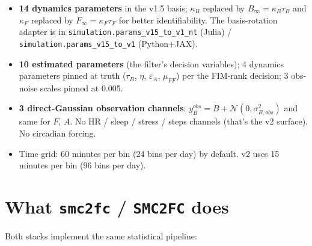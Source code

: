 \documentclass[11pt,a4paper]{article}
\begin{document}
\begin{itemize}[itemsep=2pt]
  \item \textbf{14 dynamics parameters} in the v1.5 basis;
        $\kappa_B$ replaced by $B_\infty = \kappa_B \tau_B$ and
        $\kappa_F$ replaced by $F_\infty = \kappa_F \tau_F$ for
        better identifiability. The basis-rotation adapter is in
        \texttt{simulation.params\_v15\_to\_v1\_nt} (Julia) /
        \texttt{simulation.params\_v15\_to\_v1} (Python+JAX).
  \item \textbf{10 estimated parameters} (the filter's decision
        variables); 4 dynamics parameters pinned at truth
        ($\tau_B$, $\eta$, $\varepsilon_A$, $\mu_{FF}$) per the
        FIM-rank decision; 3 obs-noise scales pinned at 0.005.
  \item \textbf{3 direct-Gaussian observation channels}: $y^{obs}_B
        = B + \mathcal{N}(0, \sigma_{B,obs}^2)$ and same for $F$,
        $A$. No HR / sleep / stress / steps channels (that's the
        v2 surface). No circadian forcing.
  \item Time grid: 60 minutes per bin (24 bins per day) by default.
        v2 uses 15 minutes per bin (96 bins per day).
\end{itemize}

\section{What \texttt{smc2fc} / \texttt{SMC2FC} does}

Both stacks implement the same statistical pipeline:
\end{document}

